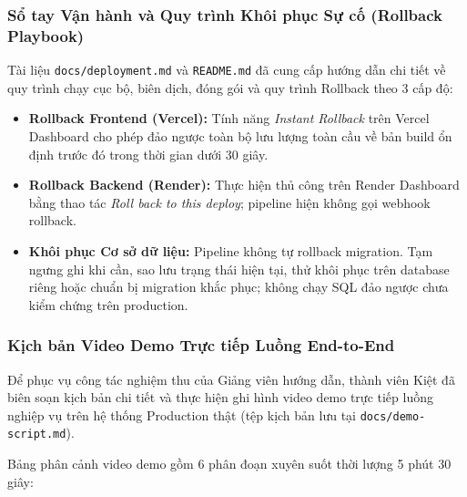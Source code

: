 \documentclass[a4paper]{article}
\begin{document}
\subsubsection{Sổ tay Vận hành và Quy trình Khôi phục Sự cố (Rollback Playbook)}
Tài liệu \texttt{docs/deployment.md} và \texttt{README.md} đã cung cấp hướng dẫn chi tiết về quy trình chạy cục bộ, biên dịch, đóng gói và quy trình Rollback theo 3 cấp độ:
\begin{itemize}
    \item \textbf{Rollback Frontend (Vercel):} Tính năng \textit{Instant Rollback} trên Vercel Dashboard cho phép đảo ngược toàn bộ lưu lượng toàn cầu về bản build ổn định trước đó trong thời gian dưới 30 giây.
    \item \textbf{Rollback Backend (Render):} Thực hiện thủ công trên Render Dashboard bằng thao tác \textit{Roll back to this deploy}; pipeline hiện không gọi webhook rollback.
    \item \textbf{Khôi phục Cơ sở dữ liệu:} Pipeline không tự rollback migration. Tạm ngưng ghi khi cần, sao lưu trạng thái hiện tại, thử khôi phục trên database riêng hoặc chuẩn bị migration khắc phục; không chạy SQL đảo ngược chưa kiểm chứng trên production.
\end{itemize}

\subsubsection{Kịch bản Video Demo Trực tiếp Luồng End-to-End}
Để phục vụ công tác nghiệm thu của Giảng viên hướng dẫn, thành viên Kiệt đã biên soạn kịch bản chi tiết và thực hiện ghi hình video demo trực tiếp luồng nghiệp vụ trên hệ thống Production thật (tệp kịch bản lưu tại \texttt{docs/demo-script.md}). 

Bảng phân cảnh video demo gồm 6 phân đoạn xuyên suốt thời lượng 5 phút 30 giây:
\end{document}
